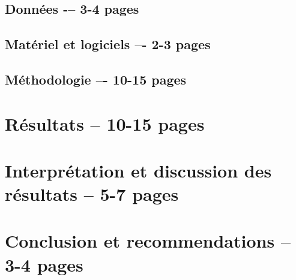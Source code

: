 \documentclass[12pt, letterpaper]{article}
\begin{document}
\subsection{Données -– 3-4 pages}

\subsection{Matériel et logiciels –- 2-3 pages}

\subsection{Méthodologie –- 10-15 pages}


\section{Résultats -- 10-15 pages}


\section{Interprétation et discussion des résultats -- 5-7 pages}


\section{Conclusion et recommendations -- 3-4 pages}


\clearpage 
\newpage
\printbibliography[title={\bibname\label{bib:references}}] 
\end{document}
